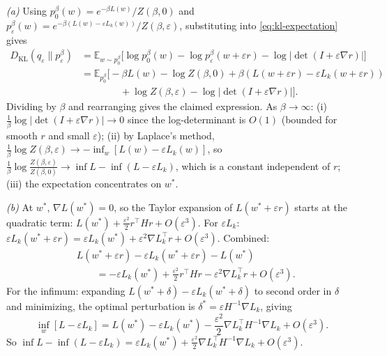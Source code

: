 \documentclass[11pt]{article}
\newcommand{\E}{\mathbb{E}}
\begin{document}
\begin{solution}[ex:bif-ot]

\textit{(a)} Using $p_0^\beta(w) = e^{-\beta L(w)}/Z(\beta,0)$ and $p_\varepsilon^\beta(w) = e^{-\beta(L(w)-\varepsilon L_k(w))}/Z(\beta,\varepsilon)$, substituting into \eqref{eq:kl-expectation} gives
\begin{align*}
  D_{\mathrm{KL}}(q_\varepsilon \| p_\varepsilon^\beta)
  &= \E_{w\sim p_0^\beta}\!\bigl[\log p_0^\beta(w) - \log p_\varepsilon^\beta(w+\varepsilon r) - \log|\det(I+\varepsilon\nabla r)|\bigr] \\
  &= \E_{p_0^\beta}\bigl[-\beta L(w) - \log Z(\beta,0) + \beta(L(w+\varepsilon r) - \varepsilon L_k(w+\varepsilon r)) \\
  &\qquad\qquad + \log Z(\beta,\varepsilon) - \log|\det(I+\varepsilon\nabla r)|\bigr].
\end{align*}
Dividing by $\beta$ and rearranging gives the claimed expression. As $\beta\to\infty$: (i) $\frac{1}{\beta}\log|\det(I+\varepsilon\nabla r)| \to 0$ since the log-determinant is $O(1)$ (bounded for smooth $r$ and small $\varepsilon$); (ii) by Laplace's method, $\frac{1}{\beta}\log Z(\beta,\varepsilon) \to -\inf_w[L(w)-\varepsilon L_k(w)]$, so $\frac{1}{\beta}\log\frac{Z(\beta,\varepsilon)}{Z(\beta,0)} \to \inf L - \inf(L-\varepsilon L_k)$, which is a constant independent of $r$; (iii) the expectation concentrates on $w^*$.

\textit{(b)} At $w^*$, $\nabla L(w^*)=0$, so the Taylor expansion of $L(w^*+\varepsilon r)$ starts at the quadratic term: $L(w^*) + \frac{\varepsilon^2}{2}r^\top Hr + O(\varepsilon^3)$. For $\varepsilon L_k$: $\varepsilon L_k(w^*+\varepsilon r) = \varepsilon L_k(w^*) + \varepsilon^2\nabla L_k^\top r + O(\varepsilon^3)$. Combined:
\begin{align*}
  &L(w^*+\varepsilon r) - \varepsilon L_k(w^*+\varepsilon r) - L(w^*) \\
  &\qquad= -\varepsilon L_k(w^*) + \frac{\varepsilon^2}{2}r^\top Hr - \varepsilon^2\nabla L_k^\top r + O(\varepsilon^3).
\end{align*}
For the infimum: expanding $L(w^*+\delta)-\varepsilon L_k(w^*+\delta)$ to second order in $\delta$ and minimizing, the optimal perturbation is $\delta^* = \varepsilon H^{-1}\nabla L_k$, giving
\[
  \inf_w[L-\varepsilon L_k] = L(w^*) - \varepsilon L_k(w^*) - \frac{\varepsilon^2}{2}\nabla L_k^\top H^{-1}\nabla L_k + O(\varepsilon^3).
\]
So $\inf L - \inf(L-\varepsilon L_k) = \varepsilon L_k(w^*) + \frac{\varepsilon^2}{2}\nabla L_k^\top H^{-1}\nabla L_k + O(\varepsilon^3)$.


\end{solution}
\end{document}
